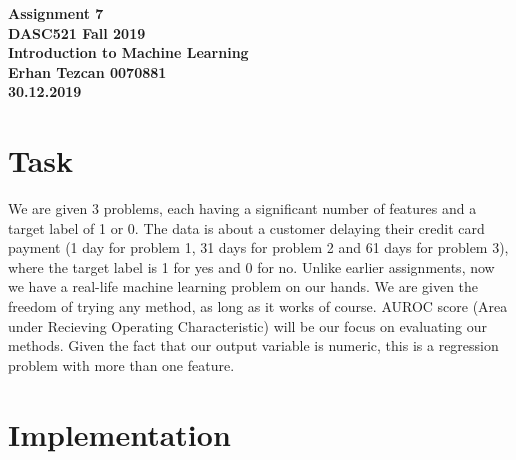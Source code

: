 \documentclass[11pt,reqno]{amsart}
\begin{document}
\begin{center}
\large\textbf{Assignment 7 \\ DASC521 Fall 2019} \\
\normalsize\textbf{Introduction to Machine Learning \\  Erhan Tezcan 0070881 \\ 30.12.2019} \\
\end{center}

\section{Task}
We are given 3 problems, each having a significant number of features and a target label of 1 or 0. The data is about a customer delaying their credit card payment (1 day for problem 1, 31 days for problem 2 and 61 days for problem 3), where the target label is 1 for yes and 0 for no. Unlike earlier assignments, now we have a real-life machine learning problem on our hands. We are given the freedom of trying any method, as long as it works of course. AUROC score (Area under Recieving Operating Characteristic) will be our focus on evaluating our methods. Given the fact that our output variable is numeric, this is a regression problem with more than one feature.

\section{Implementation}
\end{document}
